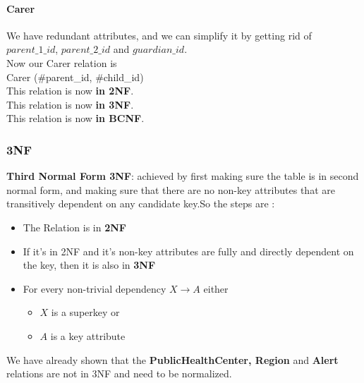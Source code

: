 \paragraph{Carer}
We have redundant attributes, and we can simplify it by getting rid of \\
$parent\_1\_id$, $parent\_2\_id$ and $guardian\_id$.\\
Now our Carer relation is \\
Carer (\#parent\_id, \#child\_id)\\
This relation is now \textbf{in 2NF}.\\
This relation is now \textbf{in 3NF}.\\
This relation is now \textbf{in BCNF}.

\subsubsection{3NF}
\begin{tcolorbox}
    \textbf{Third Normal Form 3NF}: achieved by first making sure the table is in second normal form, and making sure that there are no non-key attributes that are transitively dependent on any candidate key.So the steps are :
    \begin{itemize}
        \item The Relation is in \textbf{2NF}
        \item If it's in 2NF and it's non-key attributes are fully and directly dependent on the key, then it is also in \textbf{3NF}
        \item For every non-trivial dependency $X\rightarrow A$ either
        \begin{itemize}
            \item $X$ is a superkey or 
            \item $A$ is a key attribute
        \end{itemize}
    \end{itemize}
\end{tcolorbox}
We have already shown that the \textbf{PublicHealthCenter, Region} and \textbf{Alert} relations are not in 3NF and need to be normalized.
